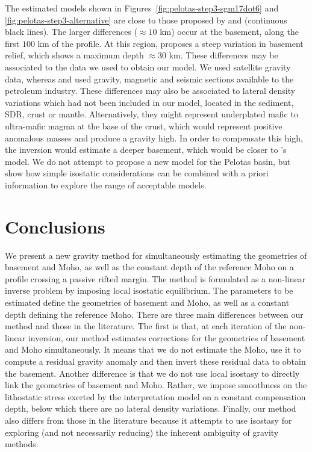 \documentclass[manuscript,revised]{geophysics}
\begin{document}
The estimated models shown in Figures~\ref{fig:pelotas-step3-sgm17dot6} and 
\ref{fig:pelotas-step3-alternative} are close to those proposed by 
\citet{stica-etal2014} and \citet{zalan2015} (continuous black lines).
The larger differences ($\approx 10$ km) occur at the basement, along the first 
$100$ km of the profile.
At this region, \citeauthor{zalan2015} proposes a steep variation in basement
relief, which shows a maximum depth $\approx 30$ km.
These differences may be associated to the data we used to obtain our model.
We used satellite gravity data, whereas \citet{stica-etal2014} and \citet{zalan2015} used
gravity, magnetic and seismic sections available to the petroleum industry.
These differences may also be associated to lateral density variations which had 
not been included in our model, located in the sediment, SDR, crust or mantle. 
Alternatively, they might represent underplated mafic to ultra-mafic 
magma at the base of the crust, which would represent positive anomalous
masses and produce a gravity high. In order to compensate this high, the 
inversion would estimate a deeper basement, which would be closer to 
\citeauthor{zalan2015}'s model.
We do not attempt to propose a new model for the Pelotas basin, but show
how simple isostatic considerations can be combined with a priori information 
to explore the range of acceptable models.


\section{Conclusions}

We present a new gravity method for simultaneously estimating the 
geometries of basement and Moho, as well as the constant depth of the reference 
Moho on a profile crossing a passive rifted margin.
The method is formulated as a non-linear inverse problem by imposing local
isostatic equilibrium.
The parameters to be estimated define the geometries of basement and Moho, 
as well as a constant depth defining the reference Moho.
There are three main differences between our method and those in the literature.
The first is that, at each iteration of the non-linear inversion, 
our method estimates corrections for the geometries of basement and Moho simultaneously. 
It means that we do not estimate the Moho, use it to compute a residual gravity anomaly
and then invert these residual data to obtain the basement.
Another difference is that we do not use local isostasy to directly link
the geometries of basement and Moho.
Rather, we impose smoothness on the lithostatic stress exerted by the interpretation 
model on a constant compensation depth, below which there are no lateral density variations.
Finally, our method also differs from those in the literature because it 
attempts to use isostasy for exploring (and not necessarily reducing) the inherent ambiguity of 
gravity methods.
\end{document}
